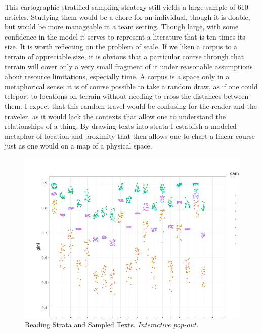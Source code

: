 \documentclass[]{book}
\theoremstyle{definition}
\theoremstyle{definition}
\theoremstyle{definition}
\theoremstyle{remark}
\begin{document}
This cartographic stratified sampling strategy still yields a large
sample of 610 articles. Studying them would be a chore for an
individual, though it is doable, but would be more manageable in a team
setting. Though large, with some confidence in the model it serves to
represent a literature that is ten times its size. It is worth
reflecting on the problem of scale. If we liken a corpus to a terrain of
appreciable size, it is obvious that a particular course through that
terrain will cover only a very small fragment of it under reasonable
assumptions about resource limitations, especially time. A corpus is a
space only in a metaphorical sense; it is of course possible to take a
random draw, as if one could teleport to locations on terrain without
needing to cross the distances between them. I expect that this random
travel would be confusing for the reader and the traveler, as it would
lack the contexts that allow one to understand the relationships of a
thing. By drawing texts into strata I establish a modeled metaphor of
location and proximity that then allows one to chart a linear course
just as one would on a map of a physical space.





\begin{figure}

{\centering \includegraphics[width=0.9\linewidth]{03_files/figure-latex/gen-samp-1} 

}

\caption{Reading Strata and Sampled Texts.
\href{https://brooksambrose.github.io/portfolio/exh/gen-samp.html}{\emph{Interactive
pop-out.}}}\label{fig:gen-samp}
\end{figure}
\end{document}
